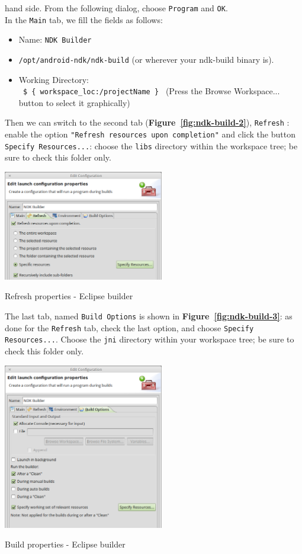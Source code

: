 \documentclass[a4paper,10pt]{article}
\makeatletter
\newenvironment{figurehere}{\def\@captype{figure}\vspace{2ex}}{\vspace{2ex}}
\newcommand{\reff}[1]{\textbf{Figure~\ref{#1}}}
\makeatother
\begin{document}
\begin{multicols}{2}
hand side. From the following dialog, choose \texttt{Program} and \texttt{OK}.\\
In the \texttt{Main} tab, we fill the fields as follows:
\begin{itemize}
\item Name: \texttt{NDK Builder}
\item \texttt{/opt/android-ndk/ndk-build} (or wherever your ndk-build binary 
is).
\item Working Directory:\\
\texttt{ \$ \{ workspace\_loc:/projectName \} } (Press the Browse Workspace... 
button to select it graphically)
\end{itemize}
Then we can switch to the second tab (\reff{fig:ndk-build-2}), \texttt{Refresh}
: enable the option \texttt{"Refresh resources upon completion"} and click the
button \texttt{Specify Resources...}: choose the \texttt{libs} directory within
the workspace tree; be sure to check this folder only.

\begin{figurehere}
 \centering
 \includegraphics[width=7cm]{./figures/ndk-build-2.png}
 \caption{Refresh properties - Eclipse builder}
 \label{fig:ndk-build-2}
\end{figurehere}

The last tab, named \texttt{Build Options} is shown in \reff{fig:ndk-build-3}:
as done for the \texttt{Refresh} tab, check the last option, and choose
\texttt{Specify Resources...}. Choose the \texttt{jni} directory within your
workspace tree; be sure to check this folder only.

\begin{figurehere}
 \centering
 \includegraphics[width=7cm]{./figures/ndk-build-3.png}
 \caption{Build properties - Eclipse builder}
 \label{fig:ndk-build-3}
\end{figurehere}


\end{multicols}
\end{document}
